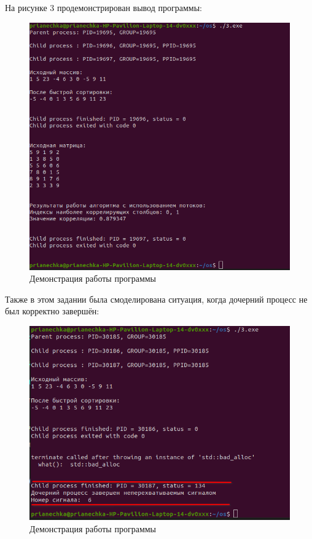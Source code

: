 На рисунке 3 продемонстрирован вывод программы:
\FloatBarrier
\begin{figure}[h]
	\begin{center}
		\includegraphics[]{inc/third.png}
	\end{center}
	\caption{Демонстрация работы программы}
\end{figure}
\FloatBarrier

Также в этом задании была смоделирована ситуация, когда дочерний процесс не был корректно завершён:
\FloatBarrier
\begin{figure}[h]
	\begin{center}
		\includegraphics[]{inc/error.png}
	\end{center}
	\caption{Демонстрация работы программы}
\end{figure}
\FloatBarrier

